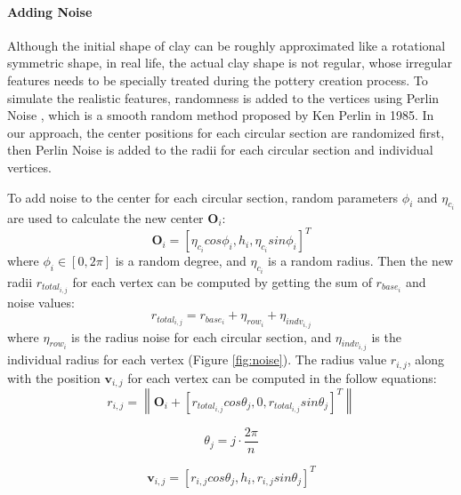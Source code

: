 \documentclass{svjour3}                     %
\begin{document}
\paragraph{Adding Noise} Although the initial shape of clay can be roughly approximated like a rotational symmetric shape, in real life, the actual clay shape is not regular, whose irregular features needs to be specially treated during the pottery creation process. To simulate the realistic features, randomness is added to the vertices using Perlin Noise \cite{Perlin1985An}, which is a smooth random method proposed by Ken Perlin in 1985.
In our approach, the center positions for each circular section are randomized first, then Perlin Noise is added to the radii for each circular section and individual vertices.

To add noise to the center for each circular section, random parameters $\phi_{i}$ and $\eta_{c_{i}}$ are used to calculate the new center $\mathbf{O}_{i}$:
\begin{equation}
\label{eqn:oi}
\mathbf{O}_{i} = \left[\eta_{c_{i}}cos\phi_{i}, h_{i}, \eta_{c_{i}}sin\phi_{i}\right]^T
\end{equation}
where $\phi_{i} \in [0, 2\pi]$ is a random degree, and $\eta_{c_{i}}$ is a random radius.
Then the new radii $r_{total_{i,j}}$ for each vertex can be computed by getting the sum of $r_{base_{i}}$ and noise values:
\begin{equation}
r_{total_{i,j}} = r_{base_{i}} + \eta_{row_{i}} + \eta_{indv_{i,j}}
\end{equation}
where $\eta_{row_{i}}$ is the radius noise for each circular section, and $\eta_{indv_{i,j}}$ is the individual radius for each vertex (Figure \ref{fig:noise}). The radius value $r_{i,j}$, along with the position $\mathbf{v}_{i,j}$ for each vertex can be computed in the follow equations:
\begin{equation}
r_{i,j} = \left\|
\mathbf{O}_{i} + \left[ r_{total_{i,j}} cos \theta_{j},
0,
r_{total_{i,j}} sin \theta_{j}
\right]^T
\right\| 
\end{equation}

\begin{equation}
\theta_{j} = j \cdot \frac{2\pi}{n}
\end{equation}

\begin{equation}
\label{eqn:v}
\mathbf{v}_{i,j} =
\left[r_{i,j}  cos \theta_{j},
h_{i},
r_{i,j} sin \theta_{j}\right]^T
\end{equation}
\end{document}
